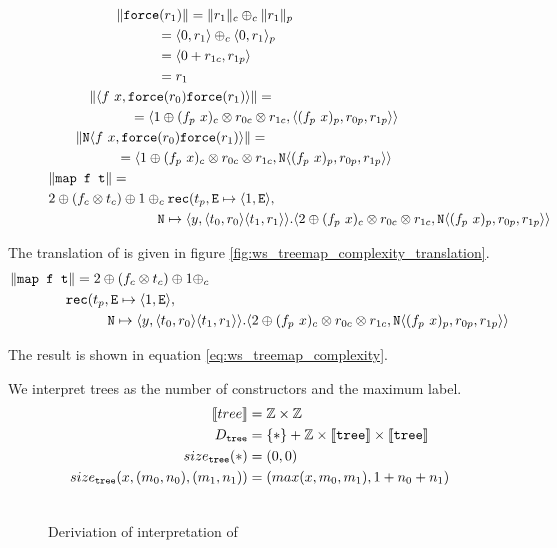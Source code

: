 \begin{figure}
\begin{equation*}
\begin{split}
      &\qquad\quad\quad\quad \|\texttt{force}(r_1)\| = \|r_1\|_c \oplus_c \|r_1\|_p \\
      &\qquad\quad\quad\quad\quad\quad\quad = \langle 0, r_1 \rangle \oplus_c \langle 0, r_1 \rangle_p \\
      &\qquad\quad\quad\quad\quad\quad\quad = \langle 0 + r_{1c}, r_{1p} \rangle \\
      &\qquad\quad\quad\quad\quad\quad\quad = r_1  \\
      &\qquad\quad \|\langle f\ x, \texttt{force}(r_0) \texttt{force}(r_1)\rangle \| = \\
      &\qquad\quad\quad\quad\quad = \langle 1 \oplus (f_p\ x)_c \otimes r_{0c} \otimes r_{1c}, \langle (f_p\ x)_p, r_{0p}, r_{1p}\rangle\rangle \\
      &\qquad \|\texttt{N}\langle f\ x, \texttt{force}(r_0) \texttt{force}(r_1)\rangle \| = \\
      &\qquad\quad\quad\quad = \langle 1 \oplus (f_p\ x)_c \otimes r_{0c} \otimes r_{1c}, \texttt{N} \langle (f_p\ x)_p, r_{0p}, r_{1p}\rangle\rangle \\
      &\|\texttt{map f t}\| = \\
      &2 \oplus (f_c \otimes t_c) \oplus 1 \oplus_c \texttt{rec}(t_p, \texttt{E} \mapsto \langle 1, \texttt{E}\rangle, \\
      &\qquad\quad\quad\quad\quad\quad\quad \texttt{N} \mapsto \langle y, \langle t_0, r_0 \rangle \langle t_1, r_1 \rangle \rangle.  \langle 2 \oplus (f_p\ x)_c \otimes r_{0c} \otimes r_{1c}, \texttt{N} \langle (f_p\ x)_p, r_{0p}, r_{1p}\rangle\rangle
    \end{split}
  \end{equation*}
\end{figure}
%

The translation of  is given in figure \ref{fig:ws_treemap_complexity_translation}.
%
\begin{equation}
  \label{eq:ws_treemap_complexity}
  \begin{split}
    &\|\texttt{map f t}\| = 2 \oplus (f_c \otimes t_c) \oplus 1 \oplus_c \\
    &\qquad\quad\quad \texttt{rec}(t_p, \texttt{E} \mapsto \langle 1, \texttt{E}\rangle, \\
    &\qquad\quad\quad\quad\quad\quad \texttt{N} \mapsto \langle y, \langle t_0, r_0 \rangle \langle t_1, r_1 \rangle \rangle.  \langle 2 \oplus (f_p\ x)_c \otimes r_{0c} \otimes r_{1c}, \texttt{N} \langle (f_p\ x)_p, r_{0p}, r_{1p}\rangle\rangle
\end{split}
\end{equation}
%

The result is shown in equation \ref{eq:ws_treemap_complexity}.

We interpret trees as the number of  constructors and the maximum label.
%
\begin{align*}
  \llbracket tree \rrbracket &= \mathbb{Z} \times \mathbb{Z} \\
  D_{\texttt{tree}} &= \{\ast\} + \mathbb{Z} \times \llbracket \texttt{tree} \rrbracket \times \llbracket \texttt{tree} \rrbracket \\
  size_{\texttt{tree}}(\ast) &= (0, 0) \\
  size_{\texttt{tree}}(x, (m_0, n_0), (m_1, n_1)) &= (max(x, m_0, m_1), 1 + n_0 + n_1)
\end{align*}
%

%
\begin{figure}
  \label{fig:ws_map_interpretation_derivation}
  \caption{Deriviation of interpretation of }
\[ \begin{split}
\end{split} \]
\end{figure}
%
